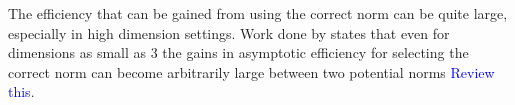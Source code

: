 \documentclass{article}
\newcommand{\vmat}{\Sigma}
\newcommand{\rvv}{Z}
\newcommand{\distv}{Q}
\begin{document}
The efficiency that can be gained from using the correct norm can be quite large, especially in high dimension settings.  Work done by \citep{pinelis_schur2-concavity_2014} states that even for dimensions as small as $3$ the gains in asymptotic efficiency for selecting the correct norm can become arbitrarily large between two potential norms \textcolor{blue}{Review this}.  



\end{document}
